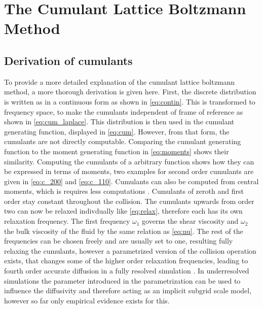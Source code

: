 \chapter{The Cumulant Lattice Boltzmann Method}
\section{Derivation of cumulants}
To provide a more detailed explanation of the cumulant lattice boltzmann method, a more thorough derivation is given here. First, the discrete distribution is written as in a continuous form as shown in \eqref{eq:contin}. This is transformed to frequency space, to make the cumulants independent of frame of reference as shown in \eqref{eq:cum_laplace}. This distribution is then used in the cumulant generating function, displayed in \eqref{eq:cum}. However, from that form, the cumulants are not directly computable. Comparing the cumulant generating function to the moment generating function in \eqref{eq:moments} shows their similarity. Computing the cumulants of a arbitrary function shows how they can be expressed in terms of moments, two examples for second order cumulants are given in \eqref{eq:c_200} and \eqref{eq:c_110}. Cumulants can also be computed from central moments, which is requires less computations \cite{geier_cumulant_2015}. Cumulants of zeroth and first order stay constant throughout the collision. The cumulants upwards from order two can now be relaxed indivdually like \eqref{eq:relax}, therefore each has its own relaxation frequency. The first frequency $\omega_1$ governs the shear viscosity and $\omega_2$ the bulk viscosity of the fluid by the same relation as \eqref{eq:nu}. The rest of the frequencies can be chosen freely and are usually set to one, resulting fully relaxing the cumulants, however a parametrized version of the collision operation exists, that changes some of the higher order relaxation frequencies, leading to fourth order accurate diffusion in a fully resolved simulation \cite{geier_parametrization_2017}. In underresolved simulations the parameter introduced in the parametrization can be used to influence the diffusivity and therefore acting as an implicit subgrid scale model, however so far only empirical evidence exists for this.\cite{geier_cumulant_2015} 
